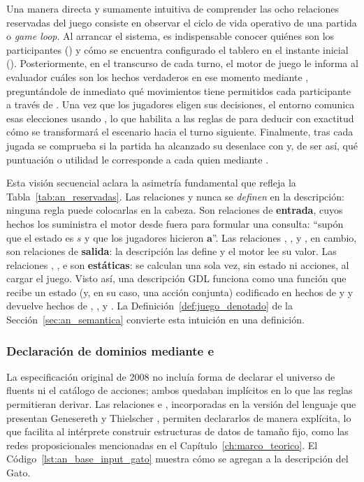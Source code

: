 Una manera directa y sumamente intuitiva de comprender las ocho relaciones reservadas del juego consiste en observar el ciclo de vida operativo de una partida o \emph{game loop}. Al arrancar el sistema, es indispensable conocer quiénes son los participantes () y cómo se encuentra configurado el tablero en el instante inicial (). Posteriormente, en el transcurso de cada turno, el motor de juego le informa al evaluador cuáles son los hechos verdaderos en ese momento mediante , preguntándole de inmediato qué movimientos tiene permitidos cada participante a través de . Una vez que los jugadores eligen sus decisiones, el entorno comunica esas elecciones usando , lo que habilita a las reglas de  para deducir con exactitud cómo se transformará el escenario hacia el turno siguiente. Finalmente, tras cada jugada se comprueba si la partida ha alcanzado su desenlace con  y, de ser así, qué puntuación o utilidad le corresponde a cada quien mediante .

Esta visión secuencial aclara la asimetría fundamental que refleja la Tabla~\ref{tab:an_reservadas}. Las relaciones  y  nunca se \emph{definen} en la descripción: ninguna regla puede colocarlas en la cabeza. Son relaciones de \textbf{entrada}, cuyos hechos los suministra el motor desde fuera para formular una consulta: ``supón que el estado es $s$ y que los jugadores hicieron $\mathbf a$''. Las relaciones , ,  y , en cambio, son relaciones de \textbf{salida}: la descripción las define y el motor lee su valor. Las relaciones , ,  e  son \textbf{estáticas}: se calculan una sola vez, sin estado ni acciones, al cargar el juego. Visto así, una descripción GDL funciona como una función que recibe un estado (y, en su caso, una acción conjunta) codificado en hechos de  y  y devuelve hechos de , ,  y . La Definición~\ref{def:juego_denotado} de la Sección~\ref{sec:an_semantica} convierte esta intuición en una definición.

\subsubsection{Declaración de dominios mediante \texorpdfstring{}{base} e \texorpdfstring{}{input}}
\label{subsec:an_base_input}

La especificación original de 2008 no incluía forma de declarar el universo de fluents ni el catálogo de acciones; ambos quedaban implícitos en lo que las reglas permitieran derivar. Las relaciones  e , incorporadas en la versión del lenguaje que presentan Genesereth y Thielscher \cite{GeneserethThielscher2014}, permiten declararlos de manera explícita, lo que facilita al intérprete construir estructuras de datos de tamaño fijo, como las redes proposicionales mencionadas en el Capítulo~\ref{ch:marco_teorico}. El Código~\ref{lst:an_base_input_gato} muestra cómo se agregan a la descripción del Gato.

